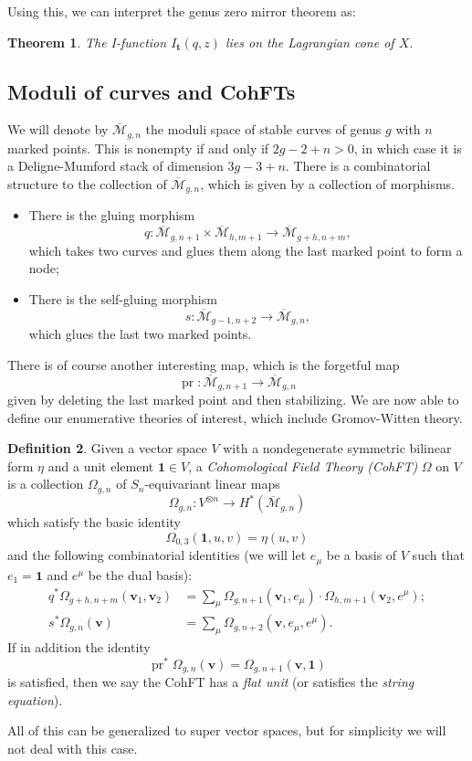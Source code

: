 \documentclass{amsart}
\newtheorem{thm}{Theorem}[section]
\theoremstyle{definition}
\newtheorem{defn}[thm]{Definition}
\theoremstyle{remark}
\theoremstyle{plain}
\theoremstyle{definition}
\theoremstyle{remark}
\newcommand{\Mbar}{\overline{\mathcal{M}}}
\newcommand{\mbf}[1]{\mathbf{#1}}
\newcommand{\bv}{\mbf{v}}
\newcommand{\1}{\mathbf{1}}
\newcommand{\2}{\mathbf{2}}
\newcommand{\3}{\mathbf{3}}
\DeclareMathOperator{\pr}{pr}
\begin{document}
Using this, we can interpret the genus zero mirror theorem as:
\begin{thm}
    The I-function \(I_{\mbf{t}}(q,z)\) lies on the Lagrangian cone of \(X\).
\end{thm}




\subsection{Moduli of curves and CohFTs}%
\label{sub:Moduli of curves and CohFTs}

We will denote by $\Mbar_{g,n}$ the moduli space of stable curves of genus $g$ with $n$ marked points. This is nonempty if and only if $2g-2+n > 0$, in which case it is a Deligne-Mumford stack of dimension $3g-3+n$. There is a combinatorial structure to the collection of $\Mbar_{g,n}$, which is given by a collection of morphisms.
\begin{itemize}
    \item There is the gluing morphism 
        \[q \colon \Mbar_{g,n+1} \times \Mbar_{h, m+1} \to \Mbar_{g+h,n+m}, \] 
        which takes two curves and glues them along the last marked point to form a node;
    \item There is the self-gluing morphism \[s \colon \Mbar_{g-1,n+2} \to \Mbar_{g,n},\] 
        which glues the last two marked points.
\end{itemize}
There is of course another interesting map, which is the forgetful map
\[ \pr \colon \Mbar_{g,n+1} \to \Mbar_{g,n} \]
given by deleting the last marked point and then stabilizing. We are now able to define our enumerative theories of interest, which include Gromov-Witten theory.

\begin{defn}
    Given a vector space $V$ with a nondegenerate symmetric bilinear form $\eta$ and a unit element $\1 \in V$, a \textit{Cohomological Field Theory (CohFT)} $\Omega$ on $V$ is a collection $\Omega_{g,n}$ of $S_n$-equivariant linear maps
    \[ \Omega_{g,n} \colon V^{\otimes n} \to H^*(\Mbar_{g,n}) \]
    which satisfy the basic identity
    \[ \Omega_{0,3}(\1, u,v) = \eta(u,v) \]
    and the following combinatorial identities (we will let $e_{\mu}$ be a basis of $V$ such that $e_1 = \1$ and $e^{\mu}$ be the dual basis):
    \begin{align*}
        q^* \Omega_{g+h,n+m}(\bv_1, \bv_2) &= \sum_{\mu} \Omega_{g,n+1}(\bv_1, e_{\mu}) \cdot \Omega_{h,m+1}(  \bv_2, e^{\mu} ); \\
        s^* \Omega_{g,n}(\bv) &= \sum_{\mu} \Omega_{g,n+2}(\bv, e_{\mu}, e^{\mu}).
    \end{align*}
    If in addition the identity
    \[ \pr^*\Omega_{g,n}(\bv) = \Omega_{g,n+1}(\bv,\1) \]
    is satisfied, then we say the CohFT has a \textit{flat unit} (or satisfies the \textit{string equation}).
\end{defn}
All of this can be generalized to super vector spaces, but for simplicity we will not deal with this case.
\end{document}
